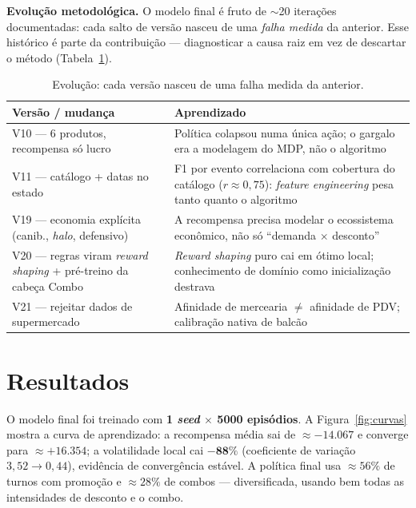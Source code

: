 \documentclass[9pt,a4paper,twoside]{tau}
\begin{document}
\textbf{Evolução metodológica.} O modelo final é fruto de \(\sim\)20
iterações documentadas: cada salto de versão nasceu de uma \emph{falha
medida} da anterior. Esse histórico é parte da contribuição ---
diagnosticar a causa raiz em vez de descartar o método
(Tabela~\ref{tab:evolucao}).

\begin{table}[htbp]
    \caption{Evolução: cada versão nasceu de uma falha medida da anterior.}
    \label{tab:evolucao}
    \centering
    \footnotesize
    \begin{tabular}{@{}p{}p{}@{}}
        \toprule
        \textbf{Versão / mudança} & \textbf{Aprendizado} \\
        \midrule
        V10 --- 6 produtos, recompensa só lucro & Política colapsou numa única ação; o gargalo era a modelagem do MDP, não o algoritmo \\
        V11 --- catálogo + datas no estado & F1 por evento correlaciona com cobertura do catálogo (\(r\approx0{,}75\)): \textit{feature engineering} pesa tanto quanto o algoritmo \\
        V19 --- economia explícita (canib., \textit{halo}, defensivo) & A recompensa precisa modelar o ecossistema econômico, não só ``demanda \(\times\) desconto'' \\
        V20 --- regras viram \textit{reward shaping} + pré-treino da cabeça Combo & \textit{Reward shaping} puro cai em ótimo local; conhecimento de domínio como inicialização destrava \\
        V21 --- rejeitar dados de supermercado & Afinidade de mercearia \(\neq\) afinidade de PDV; calibração nativa de balcão \\
        \bottomrule
    \end{tabular}
\end{table}

\section{Resultados}

O modelo final foi treinado com \textbf{1 \textit{seed}
\(\times\) 5000 episódios}. A Figura~\ref{fig:curvas} mostra a curva de
aprendizado: a recompensa média sai de \(\approx -14{.}067\) e converge
para \(\approx +16{.}354\); a volatilidade local cai \(\mathbf{-88\%}\)
(coeficiente de variação \(3{,}52 \to 0{,}44\)), evidência de convergência
estável. A política final usa \(\approx 56\%\) de turnos com promoção e
\(\approx 28\%\) de combos --- diversificada, usando bem todas as
intensidades de desconto e o combo.
\end{document}
